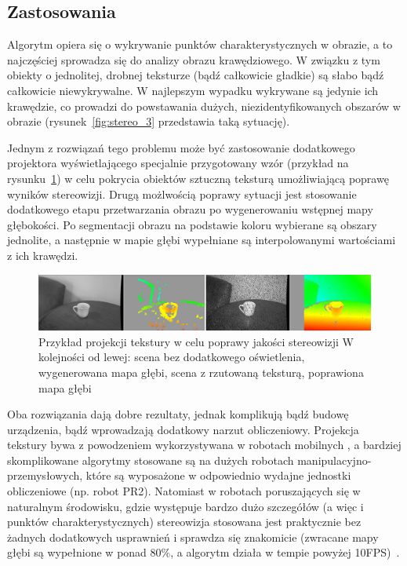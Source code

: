 \subsection{Zastosowania}

Algorytm opiera się o wykrywanie punktów charakterystycznych w obrazie, a to
najczęściej sprowadza się do analizy obrazu krawędziowego. W związku z tym
obiekty o jednolitej, drobnej teksturze (bądź całkowicie gładkie) są słabo bądź
całkowicie niewykrywalne. W najlepszym wypadku wykrywane są jedynie ich
krawędzie, co prowadzi do powstawania dużych, niezidentyfikowanych obszarów w
obrazie (rysunek~\ref{fig:stereo_3} przedstawia taką sytuację).

Jednym z rozwiązań tego problemu może być zastosowanie dodatkowego projektora
wyświetlającego specjalnie przygotowany wzór (przykład na
rysunku~\ref{fig:stereo_texture}) w celu pokrycia obiektów sztuczną teksturą
umożliwiającą poprawę wyników stereowizji. Drugą możlwością poprawy sytuacji
jest stosowanie dodatkowego etapu przetwarzania obrazu po wygenerowaniu
wstępnej mapy głębokości. Po segmentacji obrazu na podstawie koloru wybierane
są obszary jednolite, a następnie w mapie głębi wypełniane są interpolowanymi
wartościami z ich krawędzi.

\begin{figure}[htpb!]
\centering
\includegraphics[width=16cm]{../../Common/img/stereo_texture}
\caption[Przykład projekcji tekstury w celu poprawy jakości
stereowizji]{Przykład projekcji tekstury w celu poprawy jakości stereowizji
\cite{konolige-icra-2010-a} W kolejności od lewej: scena bez dodatkowego
oświetlenia, wygenerowana mapa głębi, scena z rzutowaną teksturą, poprawiona
mapa głębi}
\label{fig:stereo_texture}
\end{figure}

Oba rozwiązania dają dobre rezultaty, jednak komplikują bądź budowę urządzenia,
bądź wprowadzają dodatkowy narzut obliczeniowy. Projekcja tekstury bywa
z powodzeniem wykorzystywana w robotach mobilnych \cite{piorkowski2008}, a
bardziej skomplikowane algorytmy stosowane są na dużych robotach
manipulacyjno-przemysłowych, które są wyposażone w odpowiednio wydajne
jednostki obliczeniowe (np. robot PR2). Natomiast w robotach poruszających się
w naturalnym środowisku, gdzie występuje bardzo dużo szczegółów (a więc i
punktów charakterystycznych) stereowizja stosowana jest praktycznie bez żadnych
dodatkowych usprawnień i sprawdza się znakomicie (zwracane mapy głębi są
wypełnione w ponad 80\%, a algorytm działa w tempie powyżej 10FPS)~\cite{outdoor-stereo}.


